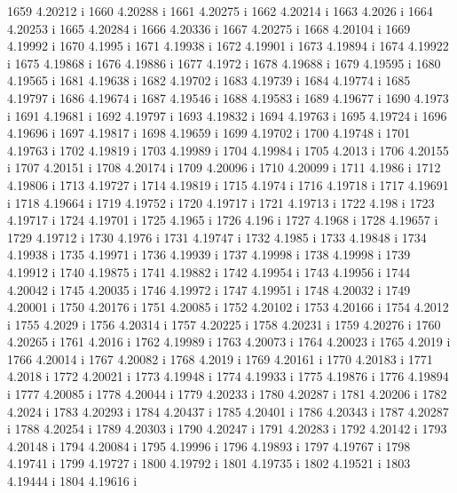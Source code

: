  1659  4.20212  i
 1660  4.20288  i
 1661  4.20275  i
 1662  4.20214  i
 1663  4.2026  i
 1664  4.20253  i
 1665  4.20284  i
 1666  4.20336  i
 1667  4.20275  i
 1668  4.20104  i
 1669  4.19992  i
 1670  4.1995  i
 1671  4.19938  i
 1672  4.19901  i
 1673  4.19894  i
 1674  4.19922  i
 1675  4.19868  i
 1676  4.19886  i
 1677  4.1972  i
 1678  4.19688  i
 1679  4.19595  i
 1680  4.19565  i
 1681  4.19638  i
 1682  4.19702  i
 1683  4.19739  i
 1684  4.19774  i
 1685  4.19797  i
 1686  4.19674  i
 1687  4.19546  i
 1688  4.19583  i
 1689  4.19677  i
 1690  4.1973  i
 1691  4.19681  i
 1692  4.19797  i
 1693  4.19832  i
 1694  4.19763  i
 1695  4.19724  i
 1696  4.19696  i
 1697  4.19817  i
 1698  4.19659  i
 1699  4.19702  i
 1700  4.19748  i
 1701  4.19763  i
 1702  4.19819  i
 1703  4.19989  i
 1704  4.19984  i
 1705  4.2013  i
 1706  4.20155  i
 1707  4.20151  i
 1708  4.20174  i
 1709  4.20096  i
 1710  4.20099  i
 1711  4.1986  i
 1712  4.19806  i
 1713  4.19727  i
 1714  4.19819  i
 1715  4.1974  i
 1716  4.19718  i
 1717  4.19691  i
 1718  4.19664  i
 1719  4.19752  i
 1720  4.19717  i
 1721  4.19713  i
 1722  4.198  i
 1723  4.19717  i
 1724  4.19701  i
 1725  4.1965  i
 1726  4.196  i
 1727  4.1968  i
 1728  4.19657  i
 1729  4.19712  i
 1730  4.1976  i
 1731  4.19747  i
 1732  4.1985  i
 1733  4.19848  i
 1734  4.19938  i
 1735  4.19971  i
 1736  4.19939  i
 1737  4.19998  i
 1738  4.19998  i
 1739  4.19912  i
 1740  4.19875  i
 1741  4.19882  i
 1742  4.19954  i
 1743  4.19956  i
 1744  4.20042  i
 1745  4.20035  i
 1746  4.19972  i
 1747  4.19951  i
 1748  4.20032  i
 1749  4.20001  i
 1750  4.20176  i
 1751  4.20085  i
 1752  4.20102  i
 1753  4.20166  i
 1754  4.2012  i
 1755  4.2029  i
 1756  4.20314  i
 1757  4.20225  i
 1758  4.20231  i
 1759  4.20276  i
 1760  4.20265  i
 1761  4.2016  i
 1762  4.19989  i
 1763  4.20073  i
 1764  4.20023  i
 1765  4.2019  i
 1766  4.20014  i
 1767  4.20082  i
 1768  4.2019  i
 1769  4.20161  i
 1770  4.20183  i
 1771  4.2018  i
 1772  4.20021  i
 1773  4.19948  i
 1774  4.19933  i
 1775  4.19876  i
 1776  4.19894  i
 1777  4.20085  i
 1778  4.20044  i
 1779  4.20233  i
 1780  4.20287  i
 1781  4.20206  i
 1782  4.2024  i
 1783  4.20293  i
 1784  4.20437  i
 1785  4.20401  i
 1786  4.20343  i
 1787  4.20287  i
 1788  4.20254  i
 1789  4.20303  i
 1790  4.20247  i
 1791  4.20283  i
 1792  4.20142  i
 1793  4.20148  i
 1794  4.20084  i
 1795  4.19996  i
 1796  4.19893  i
 1797  4.19767  i
 1798  4.19741  i
 1799  4.19727  i
 1800  4.19792  i
 1801  4.19735  i
 1802  4.19521  i
 1803  4.19444  i
 1804  4.19616  i
